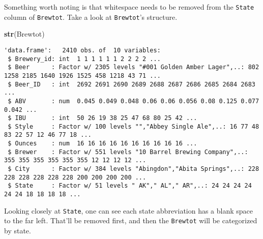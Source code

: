 \documentclass[]{article}
\newenvironment{Shaded}{\begin{snugshade}}{\end{snugshade}}
\newcommand{\DataTypeTok}[1]{\textcolor[rgb]{0.13,0.29,0.53}{#1}}
\newcommand{\KeywordTok}[1]{\textcolor[rgb]{0.13,0.29,0.53}{\textbf{#1}}}
\newcommand{\NormalTok}[1]{#1}
\newcommand{\OperatorTok}[1]{\textcolor[rgb]{0.81,0.36,0.00}{\textbf{#1}}}
\newcommand{\StringTok}[1]{\textcolor[rgb]{0.31,0.60,0.02}{#1}}
\begin{document}
Something worth noting is that whitespace needs to be removed from the
\texttt{State} column of \texttt{Brewtot}. Take a look at
\texttt{Brewtot}'s structure.

\begin{Shaded}
\begin{Highlighting}[]
\KeywordTok{str}\NormalTok{(Brewtot)}
\end{Highlighting}
\end{Shaded}

\begin{verbatim}
'data.frame':   2410 obs. of  10 variables:
 $ Brewery_id: int  1 1 1 1 1 1 2 2 2 2 ...
 $ Beer      : Factor w/ 2305 levels "#001 Golden Amber Lager",..: 802 1258 2185 1640 1926 1525 458 1218 43 71 ...
 $ Beer_ID   : int  2692 2691 2690 2689 2688 2687 2686 2685 2684 2683 ...
 $ ABV       : num  0.045 0.049 0.048 0.06 0.06 0.056 0.08 0.125 0.077 0.042 ...
 $ IBU       : int  50 26 19 38 25 47 68 80 25 42 ...
 $ Style     : Factor w/ 100 levels "","Abbey Single Ale",..: 16 77 48 83 22 57 12 46 77 18 ...
 $ Ounces    : num  16 16 16 16 16 16 16 16 16 16 ...
 $ Brewer    : Factor w/ 551 levels "10 Barrel Brewing Company",..: 355 355 355 355 355 355 12 12 12 12 ...
 $ City      : Factor w/ 384 levels "Abingdon","Abita Springs",..: 228 228 228 228 228 228 200 200 200 200 ...
 $ State     : Factor w/ 51 levels " AK"," AL"," AR",..: 24 24 24 24 24 24 18 18 18 18 ...
\end{verbatim}

Looking closely at \texttt{State}, one can see each state abbreviation
has a blank space to the far left. That'll be removed first, and then
the \texttt{Brewtot} will be categorized by state.

\begin{Shaded}
\end{Shaded}
\end{document}
